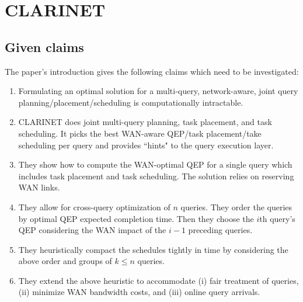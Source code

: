 \section{CLARINET}

\subsection{Given claims}

The paper's introduction gives the following claims which need to be investigated:

\begin{enumerate}
	\item Formulating an optimal solution for a multi-query, network-aware, joint query planning/placement/scheduling is computationally intractable.
	\item CLARINET does joint multi-query planning, task placement, and task scheduling.
	It picks the best WAN-aware QEP/task placement/take scheduling per query and provides ``hints" to the query execution layer.
	\item They show how to compute the WAN-optimal QEP for a single query which includes task placement and task scheduling.
	The solution relies on reserving WAN links.
	\item They allow for cross-query optimization of $n$ queries.
	They order the queries by optimal QEP expected completion time.
	Then they choose the $i$th query's QEP considering the WAN impact of the $i-1$ preceding queries.
	\item They heuristically compact the schedules tightly in time by considering the above order and groups of $k\leq n$ queries.
	\item They extend the above heuristic to accommodate (i) fair treatment of queries, (ii) minimize WAN bandwidth costs, and (iii) online query arrivals.
	
\end{enumerate}